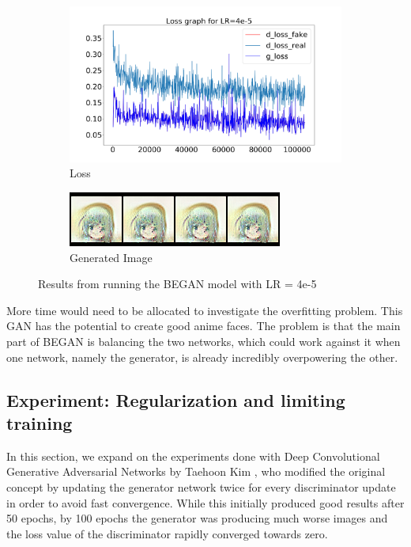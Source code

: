 \documentclass{article} %
\begin{document}
\begin{figure}[h!]
	\centering
	\begin{subfigure}[b]{0.6\linewidth}
		\includegraphics[width=\linewidth]{sami-4e-5-loss.png}
		\caption{Loss}
		\label{fig:began4e-5Loss}
	\end{subfigure}
	\begin{subfigure}[b]{0.39\linewidth}
		\includegraphics[width=\linewidth]{sami-4e-5-105500_G.png}
		\caption{Generated Image}
		\label{fig:began4e-5Gen}
	\end{subfigure}
	\caption{Results from running the BEGAN model with LR = 4e-5}
	\label{fig:began4e-5}
\end{figure}

More time would need to be allocated to investigate the overfitting problem. This GAN has the potential to create good anime faces. The problem is that the main part of BEGAN is balancing the two networks, which could work against it when one network, namely the generator, is already incredibly overpowering the other.

\subsection{Experiment: Regularization and limiting training}

In this section, we expand on the experiments done with Deep Convolutional Generative Adversarial Networks by Taehoon Kim \cite{kimDCGAN}, who modified the original concept by updating the generator network twice for every discriminator update in order to avoid fast convergence. While this initially produced good results after 50 epochs, by 100 epochs the generator was producing much worse images and the loss value of the discriminator rapidly converged towards zero.
\end{document}
